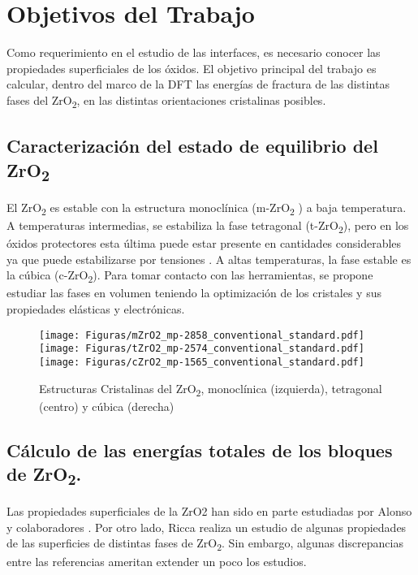 \section{Objetivos del Trabajo}

Como requerimiento en el estudio de las interfaces, es necesario conocer las 
propiedades superficiales de los óxidos. 
El objetivo principal del trabajo es calcular, dentro del marco de la DFT
las energías de fractura de las distintas fases del 
ZrO\textsubscript{2}, en las distintas orientaciones cristalinas posibles.

\subsection{Caracterización del estado de equilibrio del ZrO\textsubscript{2}}

El ZrO\textsubscript{2} es estable con la estructura monoclínica (m-ZrO\textsubscript{2 })
a baja temperatura. A temperaturas intermedias, se estabiliza la fase tetragonal 
(t-ZrO\textsubscript{2}), pero en los óxidos protectores esta última puede estar presente
en cantidades considerables \cite{Li2007} ya que puede estabilizarse por tensiones
\cite{Motta2011}. A altas temperaturas, la fase estable es la cúbica (c-ZrO\textsubscript{2}).
Para tomar contacto con las herramientas, se propone estudiar las fases en volumen 
teniendo la optimización de los cristales y sus propiedades elásticas y electrónicas.

\begin{figure}
  \center
  \texttt{[image: Figuras/mZrO2\_mp-2858\_conventional\_standard.pdf]}
  \texttt{[image: Figuras/tZrO2\_mp-2574\_conventional\_standard.pdf]}
  \texttt{[image: Figuras/cZrO2\_mp-1565\_conventional\_standard.pdf]}

  \caption{\protect \label{FiguraCristalesZrO2}
  Estructuras Cristalinas del ZrO\textsubscript{2}, monoclínica (izquierda), tetragonal (centro)
  y cúbica (derecha)
  }
\end{figure}

\subsection{ Cálculo de las energías totales de los bloques de ZrO\textsubscript{2}.}

Las propiedades superficiales de la ZrO2 han sido en parte estudiadas por
Alonso y colaboradores \cite{Alonso2018}. Por otro lado, Ricca
\cite{ricca2015revealing} realiza un estudio de algunas propiedades de las superficies de 
distintas fases de ZrO\textsubscript{2}. Sin embargo, algunas discrepancias entre las referencias
ameritan extender un poco los estudios. 

